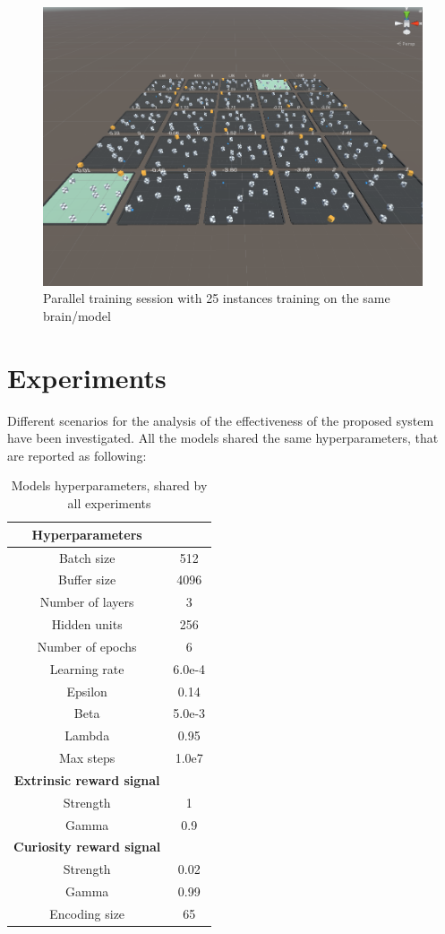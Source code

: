 \documentclass{ifacconf}
\begin{document}
\begin{figure}[!hb]
\begin{center}
\includegraphics[width=\linewidth]{res/un_parenv.png} 
\caption{Parallel training session with 25 instances training on the same brain/model} 
\label{fig:graphical_env}
\end{center}
\end{figure}

\section{Experiments}
Different scenarios for the analysis of the effectiveness of the proposed system have been investigated. All the models shared the same hyperparameters, that are reported as following:

\begin{table}[ht]
\centering
\caption{Models hyperparameters, shared by all experiments}
\begin{tabular}[t]{cc}
\hline
\textbf{Hyperparameters}&\\
\hline
Batch size&512\\
Buffer size&4096\\
Number of layers&3\\
Hidden units&256\\
Number of epochs&6\\
Learning rate&6.0e-4\\
Epsilon&0.14\\
Beta&5.0e-3\\
Lambda&0.95\\
Max steps&1.0e7\\
\hline
\textbf{Extrinsic reward signal}&\\
\hline
Strength&1\\
Gamma&0.9\\
\hline
\textbf{Curiosity reward signal}&\\
\hline
Strength&0.02\\
Gamma&0.99\\
Encoding size&65\\
\end{tabular}
\end{table}%
\end{document}
